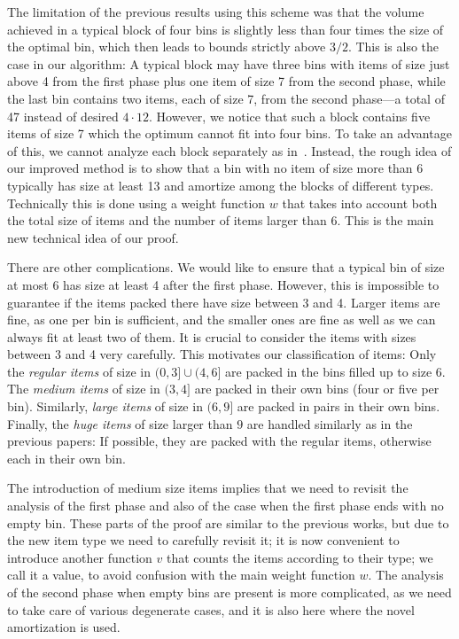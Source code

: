 The limitation of the previous results using this scheme was that the
volume achieved in a typical block of four bins is slightly less than
four times the size of the optimal bin, which then leads to bounds
strictly above $3/2$. This is also the case in our algorithm: A
typical block may have three bins with items of size just above 4 from
the first phase plus one item of size 7 from the second phase, while
the last bin contains two items, each of size 7, from the second
phase---a total of 47 instead of desired $4 \cdot 12$. However, we
notice that such a block contains five items of size 7 which the
optimum cannot fit into four bins. To take an advantage of this, we
cannot analyze each block separately as
in~\cite{kellerer2013,gabay2013}.  Instead, the rough idea of our
improved method is to show that a bin with no item of size more than 6
typically has size at least 13 and amortize among the blocks of
different types. Technically this is done using a weight function $w$
that takes into account both the total size of items and the number of
items larger than 6. This is the main new technical idea of our proof.

There are other complications. We would like to ensure that a typical bin
of size at most 6 has size at least 4 after the first phase. However,
this is impossible to 
guarantee if the items packed there have size between 3 and 4. Larger
items are fine, as one per bin is sufficient, and the smaller ones are
fine as well as we can always fit at least two of them.
It is crucial to consider the items with sizes between 3 and 4 very 
carefully.
This motivates
our classification of items: Only the \emph{regular items} of size in
$(0,3]\cup(4,6]$ are packed in the bins filled up to size 6. The
\emph{medium items} of size in $(3,4]$ are packed in their own bins (four or
five per bin). Similarly, \emph{large items} of size in $(6,9]$ are
packed in pairs in their own bins. Finally, the \emph{huge items} of size
larger than $9$ are handled similarly as in the previous papers:
If possible, they are packed with the regular items, otherwise each in
their own bin.

The introduction of medium size items implies that we need to
revisit the analysis of the first phase and also of the case when the
first phase ends with no empty bin. These parts of the proof are
similar to the previous works, but due to the new item type we need to
carefully revisit it; it is now convenient to introduce another 
function $v$ that counts the items according to their type; we call it
a value, to avoid confusion with the main weight function $w$. The
analysis of the second phase when empty bins are present is more
complicated, as we need to take care of various degenerate cases, and
it is also here where the novel amortization is used.

